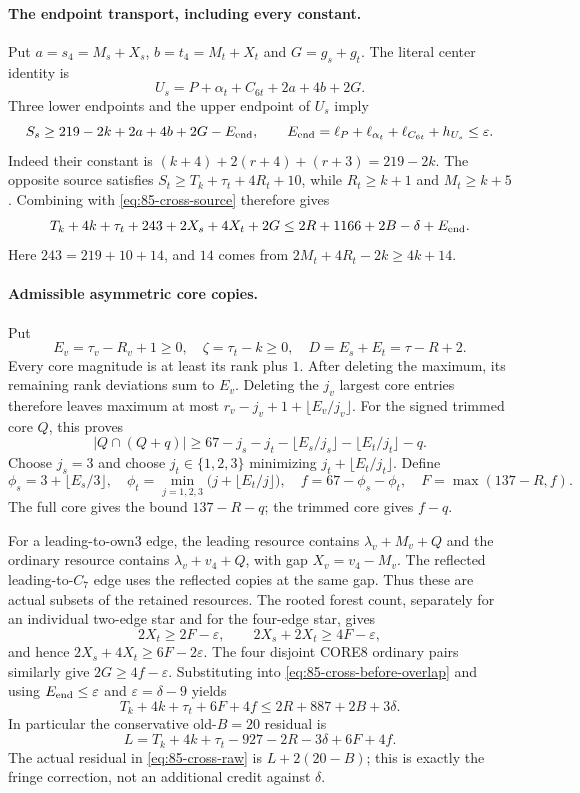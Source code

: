 \documentclass[10pt,a4paper]{article}
\theoremstyle{definition}
\begin{document}
\paragraph{The endpoint transport, including every constant.}
Put $a=s_4=M_s+X_s$, $b=t_4=M_t+X_t$ and $G=g_s+g_t$.
The literal center identity is
\[
 U_s=P+\alpha_t+C_{6t}+2a+4b+2G.
\]
Three lower endpoints and the upper endpoint of $U_s$ imply
\[
 S_s\ge219-2k+2a+4b+2G-E_{\rm end},\qquad
 E_{\rm end}=\ell_P+\ell_{\alpha_t}+\ell_{C_{6t}}+h_{U_s}
 \le\varepsilon.
\]
Indeed their constant is
$(k+4)+2(r+4)+(r+3)=219-2k$.
The opposite source satisfies
$S_t\ge T_k+\tau_t+4R_t+10$, while
$R_t\ge k+1$ and $M_t\ge k+5$.
Combining with \eqref{eq:85-cross-source} therefore gives
\begin{equation}\label{eq:85-cross-before-overlap}
 T_k+4k+\tau_t+243+2X_s+4X_t+2G
 \le2R+1166+2B-\delta+E_{\rm end}.
\end{equation}
Here $243=219+10+14$, and $14$ comes from
$2M_t+4R_t-2k\ge4k+14$.

\paragraph{Admissible asymmetric core copies.}
Put
\[
 E_v=\tau_v-R_v+1\ge0,\quad
 \zeta=\tau_t-k\ge0,\quad D=E_s+E_t=\tau-R+2.
\]
Every core magnitude is at least its rank plus $1$.
After deleting the maximum, its remaining rank deviations sum to $E_v$.
Deleting the $j_v$ largest core entries therefore leaves maximum at most
$r_v-j_v+1+\lfloor E_v/j_v\rfloor$.
For the signed trimmed core $Q$, this proves
\[
 |Q\cap(Q+q)|\ge
 67-j_s-j_t-\lfloor E_s/j_s\rfloor-\lfloor E_t/j_t\rfloor-q.
\]
Choose $j_s=3$ and choose $j_t\in\{1,2,3\}$ minimizing
$j_t+\lfloor E_t/j_t\rfloor$. Define
\[
 \phi_s=3+\lfloor E_s/3\rfloor,\quad
 \phi_t=\min_{j=1,2,3}\bigl(j+\lfloor E_t/j\rfloor\bigr),\quad
 f=67-\phi_s-\phi_t,
 \quad F=\max(137-R,f).
\]
The full core gives the bound $137-R-q$; the trimmed core gives $f-q$.

For a leading-to-own3 edge, the leading resource contains
$\lambda_v+M_v+Q$ and the ordinary resource contains
$\lambda_v+v_4+Q$, with gap $X_v=v_4-M_v$.
The reflected leading-to-$C_7$ edge uses the reflected copies at the
same gap. Thus these are actual subsets of the retained resources.
The rooted forest count, separately for an individual two-edge star
and for the four-edge star, gives
\[
 2X_t\ge2F-\varepsilon,\qquad
 2X_s+2X_t\ge4F-\varepsilon,
\]
and hence $2X_s+4X_t\ge6F-2\varepsilon$.
The four disjoint CORE8 ordinary pairs similarly give
$2G\ge4f-\varepsilon$.
Substituting into \eqref{eq:85-cross-before-overlap} and using
$E_{\rm end}\le\varepsilon$ and $\varepsilon=\delta-9$ yields
\begin{equation}\label{eq:85-cross-raw}
 T_k+4k+\tau_t+6F+4f
 \le2R+887+2B+3\delta.
\end{equation}
In particular the conservative old-$B=20$ residual is
\[
 L=T_k+4k+\tau_t-927-2R-3\delta+6F+4f.
\]
The actual residual in \eqref{eq:85-cross-raw} is
$L+2(20-B)$; this is exactly the fringe correction, not an additional
credit against $\delta$.
\end{document}
